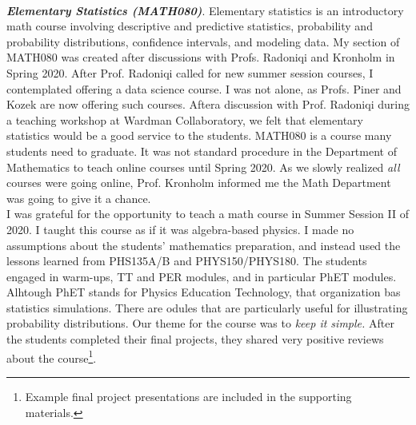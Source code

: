 \documentclass[../../../main.tex]{subfiles}
\begin{document}
\\
\vspace{0.25cm}
\textbf{\textit{Elementary Statistics (MATH080)}}. Elementary statistics is an introductory math course involving descriptive and predictive statistics, probability and probability distributions, confidence intervals, and modeling data.  My section of MATH080 was created after discussions with Profs. Radoniqi and Kronholm in Spring 2020.  After Prof. Radoniqi called for new summer session courses, I contemplated offering a data science course.  I was not alone, as Profs. Piner and Kozek are now offering such courses.  Aftera  discussion with Prof. Radoniqi during a teaching workshop at Wardman Collaboratory, we felt that elementary statistics would be a good service to the students.  MATH080 is a course many students need to graduate.  It was not standard procedure in the Department of Mathematics to teach online courses until Spring 2020.  As we slowly realized \textit{all} courses were going online, Prof. Kronholm informed me the Math Department was going to give it a chance.
\\
\vspace{0.25cm}
I was grateful for the opportunity to teach a math course in Summer Session II of 2020.  I taught this course as if it was algebra-based physics.  I made no assumptions about the students' mathematics preparation, and instead used the lessons learned from PHS135A/B and PHYS150/PHYS180.  The students engaged in warm-ups, TT and PER modules, and in particular PhET modules.  Alhtough PhET stands for Physics Education Technology, that organization bas statistics simulations.  There are odules that are particularly useful for illustrating probability distributions.  Our theme for the course was to \textit{keep it simple.}  After the students completed their final projects, they shared very positive reviews about the course\footnote{Example final project presentations are included in the supporting materials.}.
\end{document}
